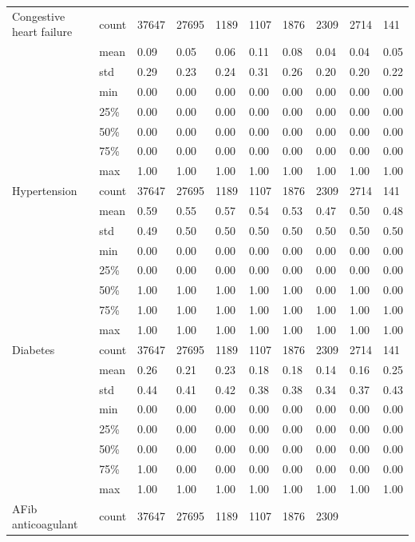 \begin{landscape}
{\begin{longtable}[]{@{}llllllllll@{}}
Congestive heart failure & count & 37647 & 27695 & 1189 & 1107 & 1876
& 2309 & 2714 & 141 \\
& mean & 0.09 & 0.05 & 0.06 & 0.11 & 0.08 & 0.04 & 0.04 & 0.05 \\
& std & 0.29 & 0.23 & 0.24 & 0.31 & 0.26 & 0.20 & 0.20 & 0.22 \\
& min & 0.00 & 0.00 & 0.00 & 0.00 & 0.00 & 0.00 & 0.00 & 0.00 \\
& 25\% & 0.00 & 0.00 & 0.00 & 0.00 & 0.00 & 0.00 & 0.00 & 0.00 \\
& 50\% & 0.00 & 0.00 & 0.00 & 0.00 & 0.00 & 0.00 & 0.00 & 0.00 \\
& 75\% & 0.00 & 0.00 & 0.00 & 0.00 & 0.00 & 0.00 & 0.00 & 0.00 \\
& max & 1.00 & 1.00 & 1.00 & 1.00 & 1.00 & 1.00 & 1.00 & 1.00 \\
Hypertension & count & 37647 & 27695 & 1189 & 1107 & 1876 & 2309 & 2714
& 141 \\
& mean & 0.59 & 0.55 & 0.57 & 0.54 & 0.53 & 0.47 & 0.50 & 0.48 \\
& std & 0.49 & 0.50 & 0.50 & 0.50 & 0.50 & 0.50 & 0.50 & 0.50 \\
& min & 0.00 & 0.00 & 0.00 & 0.00 & 0.00 & 0.00 & 0.00 & 0.00 \\
& 25\% & 0.00 & 0.00 & 0.00 & 0.00 & 0.00 & 0.00 & 0.00 & 0.00 \\
& 50\% & 1.00 & 1.00 & 1.00 & 1.00 & 1.00 & 0.00 & 1.00 & 0.00 \\
& 75\% & 1.00 & 1.00 & 1.00 & 1.00 & 1.00 & 1.00 & 1.00 & 1.00 \\
& max & 1.00 & 1.00 & 1.00 & 1.00 & 1.00 & 1.00 & 1.00 & 1.00 \\
Diabetes & count & 37647 & 27695 & 1189 & 1107 & 1876 & 2309 & 2714 &
141 \\
& mean & 0.26 & 0.21 & 0.23 & 0.18 & 0.18 & 0.14 & 0.16 & 0.25 \\
& std & 0.44 & 0.41 & 0.42 & 0.38 & 0.38 & 0.34 & 0.37 & 0.43 \\
& min & 0.00 & 0.00 & 0.00 & 0.00 & 0.00 & 0.00 & 0.00 & 0.00 \\
& 25\% & 0.00 & 0.00 & 0.00 & 0.00 & 0.00 & 0.00 & 0.00 & 0.00 \\
& 50\% & 0.00 & 0.00 & 0.00 & 0.00 & 0.00 & 0.00 & 0.00 & 0.00 \\
& 75\% & 1.00 & 0.00 & 0.00 & 0.00 & 0.00 & 0.00 & 0.00 & 0.00 \\
& max & 1.00 & 1.00 & 1.00 & 1.00 & 1.00 & 1.00 & 1.00 & 1.00 \\
AFib anticoagulant & count & 37647 & 27695 & 1189 & 1107 & 1876 & 2309

\end{longtable}}
\end{landscape}
